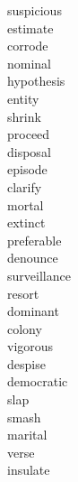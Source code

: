 \documentclass[a4paper, 10pt]{ctexart}
\begin{document}
\begin{multicols*}{2}
\begin{description}
\item[suspicious]

\item[estimate]

\item[corrode]

\item[nominal]

\item[hypothesis]

\item[entity]

\item[shrink]

\item[proceed]

\item[disposal]

\item[episode]

\item[clarify]

\item[mortal]

\item[extinct]

\item[preferable]

\item[denounce]

\item[surveillance]

\item[resort]

\item[dominant]

\item[colony]

\item[vigorous]

\item[despise]

\item[democratic]

\item[slap]

\item[smash]

\item[marital]

\item[verse]

\item[insulate]


\end{description}
\end{multicols*}
\end{document}
